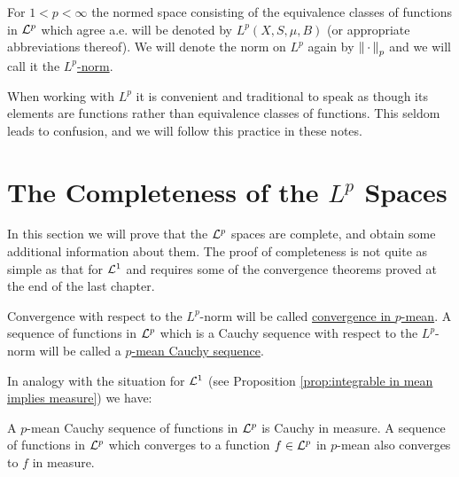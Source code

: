 \begin{definition}
For $1<p<\infty$ the normed space consisting of the equivalence classes of functions in ${\cal L}^p$ which agree a.e. will be denoted by $L^p(X,S,\mu,B)$ (or appropriate abbreviations thereof). We will denote the norm on $L^p$ again by $\norm{\,\cdot\,}_p$ and we will call it the \underline{$L^p$-norm}.
\end{definition}

When working with $L^p$ it is convenient and traditional to speak as though its elements are functions rather than equivalence classes of functions. This seldom leads to confusion, and we will follow this practice in these notes.

\section{The Completeness of the \texorpdfstring{$L^p$}{Lp} Spaces}

In this section we will prove that the ${\cal L}^p$ spaces are complete, and obtain some additional information about them. The proof of completeness is not quite as simple as that for ${\cal L}^1$ and requires some of the convergence theorems proved at the end of the last chapter.

\begin{definition}
Convergence with respect to the $L^p$-norm will be called \underline{convergence in $p$-mean}. A sequence of functions in ${\cal L}^p$ which is a Cauchy sequence with respect to the $L^p$-norm will be called a \underline{$p$-mean Cauchy sequence}.
\end{definition}

In analogy with the situation for ${\cal L}^1$ (see Proposition \ref{prop:integrable in mean implies measure}) we have:

\begin{proposition}
\label{prop:p mean implies in measure}
A $p$-mean Cauchy sequence of functions in ${\cal L}^p$ is Cauchy in measure. A sequence of functions in ${\cal L}^p$ which converges to a function $f\in{\cal L}^p$ in $p$-mean also converges to $f$ in measure.
\end{proposition}

